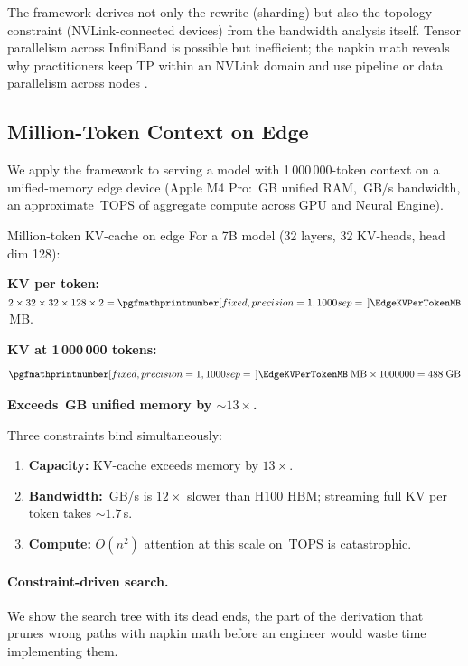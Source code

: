 \documentclass[10pt,twocolumn]{article}
\newcommand{\cval}[1]{\pgfmathprintnumber[fixed, precision=1, 1000 sep={\,}]{#1}}
\newcommand{\cvalint}[1]{\pgfmathprintnumber[fixed, precision=0, 1000 sep={\,}]{#1}}
\newcommand{\EdgeCtxTokens}{1\,000\,000}
\newcommand{\EdgeCtxTokensRaw}{1000000}
\newcommand{\EdgeKVTotalGB}{488}  %
\begin{document}
The framework derives not only the rewrite (sharding) but also the topology constraint (NVLink-connected devices) from the bandwidth analysis itself. Tensor parallelism across InfiniBand is possible but inefficient; the napkin math reveals why practitioners keep TP within an NVLink domain and use pipeline or data parallelism across nodes \citep{narayanan2021}.

\subsection{Million-Token Context on Edge}
\label{sec:edge-analysis}

We apply the framework to serving a model with \EdgeCtxTokens{}-token context on a unified-memory edge device (Apple M4 Pro: \cvalint{\EdgeRAMGB}\,GB unified RAM, \cvalint{\EdgeBWGBs}\,GB/s bandwidth, an approximate \cvalint{\EdgeTFLOPS}\,TOPS of aggregate compute across GPU and Neural Engine).

\begin{napkinmath}{Million-token KV-cache on edge}
For a 7B model (32 layers, 32 KV-heads, head dim 128):

\textbf{KV per token:} $2 \times 32 \times 32 \times 128 \times 2 = \cval{\EdgeKVPerTokenMB}$\,MB.

\textbf{KV at \EdgeCtxTokens{} tokens:}
\[
\cval{\EdgeKVPerTokenMB}\;\text{MB} \times \EdgeCtxTokensRaw{} = \EdgeKVTotalGB{}\;\text{GB}
\]

\textbf{Exceeds \cvalint{\EdgeRAMGB}\,GB unified memory by ${\sim}13\times$.}

Three constraints bind simultaneously:
\begin{enumerate}[nosep]
\item \textbf{Capacity:} KV-cache exceeds memory by $13\times$.
\item \textbf{Bandwidth:} \cvalint{\EdgeBWGBs}\,GB/s is $12\times$ slower than H100 HBM; streaming full KV per token takes ${\sim}1.7$\,s.
\item \textbf{Compute:} $O(n^2)$ attention at this scale on \cvalint{\EdgeTFLOPS}\,TOPS is catastrophic.
\end{enumerate}
\end{napkinmath}

\paragraph{Constraint-driven search.} We show the search tree with its dead ends, the part of the derivation that prunes wrong paths with napkin math before an engineer would waste time implementing them.
\end{document}

